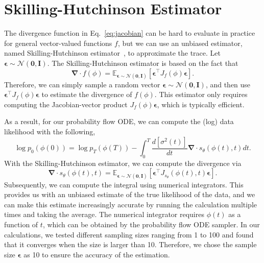 \section{Skilling-Hutchinson Estimator}\label{app:she}

The divergence function in Eq.~\eqref{eq:jacobian} can be hard to evaluate in practice for general vector-valued functions $f$, but we can use an unbiased estimator, named Skilling-Hutchinson estimator~\cite{grathwohl2018scalable}, to approximate the trace. Let $\boldsymbol \epsilon \sim \mathcal{N}(\mathbf{0}, \mathbf{I})$. The Skilling-Hutchinson estimator is based on the fact that
\begin{equation}
\mathbf{\nabla}\cdot f(\phi) = \mathbb{E}_{\boldsymbol\epsilon \sim \mathcal{N}(\mathbf{0}, \mathbf{I})}\left[\boldsymbol\epsilon^\intercal  J_f(\phi) \boldsymbol\epsilon\right].
\end{equation}
Therefore, we can simply sample a random vector $\boldsymbol \epsilon \sim \mathcal{N}(\mathbf{0}, \mathbf{I})$, and then use $\boldsymbol \epsilon^\intercal J_f(\phi) \boldsymbol \epsilon$ to estimate the divergence of $f(\phi)$. This estimator only requires computing the Jacobian-vector product $J_f(\phi)\boldsymbol \epsilon$, which is typically efficient.

As a result, for our probability flow ODE, we can compute the (log) data likelihood with the following,
\begin{equation}
\log p_0(\phi(0)) = \log p_T(\phi(T)) -\int_0^T \frac{d[\sigma^2(t)]}{dt} \mathbf{\nabla}\cdot s_\theta(\phi(t), t) dt.
\end{equation}
With the Skilling-Hutchinson estimator, we can compute the divergence via
\begin{equation}
\mathbf{\nabla}\cdot s_\theta(\phi(t), t) = \mathbb{E}_{\boldsymbol\epsilon \sim \mathcal{N}(\mathbf{0}, \mathbf{I})}\left[\boldsymbol\epsilon^\intercal  J_{s_\theta}(\phi(t), t) \boldsymbol\epsilon\right].
\end{equation}
Subsequently, we can compute the integral using numerical integrators. This provides us with an unbiased estimate of the true likelihood of the data, and we can make this estimate increasingly accurate by running the calculation multiple times and taking the average. The numerical integrator requires $\phi(t)$ as a function of $t$, which can be obtained by the probability flow ODE sampler. In our calculations, we tested different sampling sizes ranging from 1 to 100 and found that it converges when the size is larger than 10. Therefore, we chose the sample size $\boldsymbol\epsilon$ as 10 to ensure the accuracy of the estimation.


